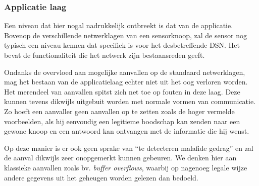 \vspace{-5mm}

\subsubsection*{Applicatie laag}

Een niveau dat hier nogal nadrukkelijk ontbreekt is dat van de applicatie.
Bovenop de verschillende netwerklagen van een sensorknoop, zal de sensor nog
typisch een niveau kennen dat specifiek is voor het desbetreffende DSN. Het
bevat de functionaliteit die het netwerk zijn bestaansreden geeft.

Ondanks de overvloed aan mogelijke aanvallen op de standaard netwerklagen, mag
het bestaan van de applicatielaag echter niet uit het oog verloren worden. Het
merendeel van aanvallen spitst zich net toe op fouten in deze laag. Deze kunnen
tevens dikwijls uitgebuit worden met normale vormen van communicatie. Zo hoeft
een aanvaller geen aanvallen op te zetten zoals de hoger vermelde voorbeelden,
als hij eenvoudig een legitieme boodschap kan zenden naar een gewone knoop en
een antwoord kan ontvangen met de informatie die hij wenst.

Op deze manier is er ook geen sprake van ``te detecteren malafide gedrag'' en
zal de aanval dikwijls zeer onopgemerkt kunnen gebeuren. We denken hier aan
klassieke aanvallen zoals bv. \emph{buffer overflows}, waarbij op nagenoeg
legale wijze andere gegevens uit het geheugen worden gelezen dan bedoeld.
